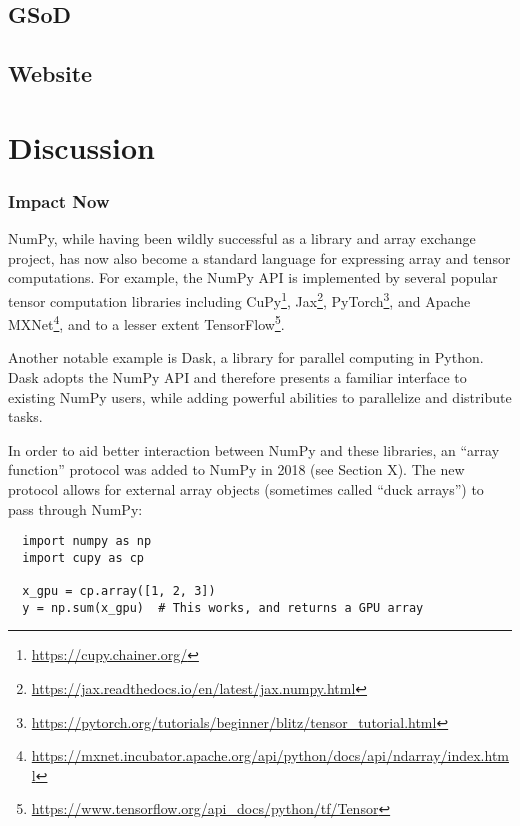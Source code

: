 \documentclass[fleqn,10pt]{wlscirep}
\begin{document}

\subsection*{GSoD}

\subsection*{Website}

\section*{Discussion}

\subsubsection*{Impact Now}

NumPy, while having been wildly successful as a library and array
exchange project, has now also become a standard language for expressing array
and tensor computations.  For example, the NumPy API is implemented by
several popular tensor computation libraries including
CuPy\footnote{\url{https://cupy.chainer.org/}},
Jax\footnote{\url{https://jax.readthedocs.io/en/latest/jax.numpy.html}},
PyTorch\footnote{\url{https://pytorch.org/tutorials/beginner/blitz/tensor\_tutorial.html}}, and
Apache MXNet\footnote{\url{https://mxnet.incubator.apache.org/api/python/docs/api/ndarray/index.html}},
and to a lesser extent
TensorFlow\footnote{\url{https://www.tensorflow.org/api\_docs/python/tf/Tensor}}.

Another notable example is Dask, a library for parallel computing in
Python.  Dask adopts the NumPy API and therefore presents a familiar
interface to existing NumPy users, while adding powerful abilities to
parallelize and distribute tasks.

In order to aid better interaction between NumPy and these libraries,
an ``array function'' protocol was added to NumPy in 2018 (see Section
X). The new protocol allows for external array objects (sometimes
called ``duck arrays'') to pass through NumPy:

\begin{lstlisting}
  import numpy as np
  import cupy as cp

  x_gpu = cp.array([1, 2, 3])
  y = np.sum(x_gpu)  # This works, and returns a GPU array
\end{lstlisting}
\end{document}
